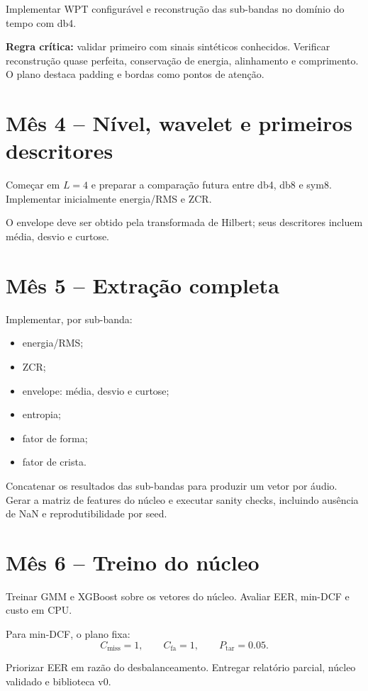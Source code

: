 \documentclass[12pt,a4paper]{article}
\begin{document}
Implementar WPT configurável e reconstrução das sub-bandas no domínio do tempo com db4.

\textbf{Regra crítica:} validar primeiro com sinais sintéticos conhecidos. Verificar reconstrução quase perfeita, conservação de energia, alinhamento e comprimento. O plano destaca padding e bordas como pontos de atenção.

\section{Mês 4 -- Nível, wavelet e primeiros descritores}

Começar em $L=4$ e preparar a comparação futura entre db4, db8 e sym8. Implementar inicialmente energia/RMS e ZCR.

O envelope deve ser obtido pela transformada de Hilbert; seus descritores incluem média, desvio e curtose.

\section{Mês 5 -- Extração completa}

Implementar, por sub-banda:
\begin{itemize}
\item energia/RMS;
\item ZCR;
\item envelope: média, desvio e curtose;
\item entropia;
\item fator de forma;
\item fator de crista.
\end{itemize}

Concatenar os resultados das sub-bandas para produzir um vetor por áudio. Gerar a matriz de features do núcleo e executar sanity checks, incluindo ausência de NaN e reprodutibilidade por seed.

\section{Mês 6 -- Treino do núcleo}

Treinar GMM e XGBoost sobre os vetores do núcleo. Avaliar EER, min-DCF e custo em CPU.

Para min-DCF, o plano fixa:
\[
C_{\mathrm{miss}}=1,\qquad C_{\mathrm{fa}}=1,\qquad P_{\mathrm{tar}}=0.05.
\]

Priorizar EER em razão do desbalanceamento. Entregar relatório parcial, núcleo validado e biblioteca v0.
\end{document}
